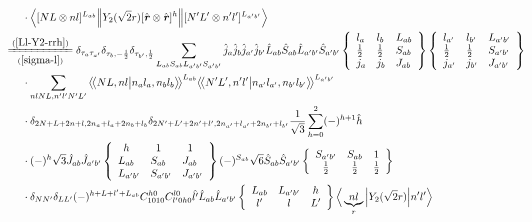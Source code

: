 \documentclass[master]{shnuthesis}
\newcommand{\llangle}{\big\langle\!\big\langle}
\newcommand{\rrangle}{\big\rangle\!\big\rangle}
\newcommand{\bmr}{\textbf{\textit{r}}}
\newcommand{\ap}{a^\prime}
\newcommand{\bp}{b^\prime}
\newcommand{\il}{\!\!\!\!\!\!\!\!\!\!}
\newcommand{\zdydh}{\xlongequal}
\begin{document}
\begin{align}
    & \cdot \Big\langle [N L \otimes n l]^{L_{ab}} \Big\| Y_2(\sqrt{2}r) [\hat{\bmr} \otimes \hat{\bmr}]^h \Big\| [N^\prime L^\prime \otimes n^\prime l^\prime]^{L_{\ap\bp}} \Big\rangle \\
    &\il \zdydh[(\ref{sigma-l})]{(\ref{Ll-Y2-rrh})} \delta_{\tau_a \tau_{\ap}}\delta_{\tau_b, -\frac{1}{2}}\delta_{\tau_{\bp}, \frac{1}{2}} \sum_{L_{ab}S_{ab}L_{\ap\bp}S_{\ap\bp}} \hat{j}_a\hat{j}_b\hat{j}_{\ap}\hat{j}_{\bp}\hat{L}_{ab}\hat{S}_{ab}\hat{L}_{\ap\bp}\hat{S}_{\ap\bp}  \left\{\begin{array}{lll}l_{a} & l_{b} & L_{ab} \\ \frac{1}{2} & \frac{1}{2} & S_{ab} \\j_{a} & j_{b} & J_{ab} \end{array}\right\} \left\{\begin{array}{lll}l_{\ap} & l_{\bp} & L_{\ap\bp} \\ \frac{1}{2} & \frac{1}{2} & S_{\ap\bp} \\j_{\ap} & j_{\bp} & J_{\ap\bp} \end{array}\right\}  \notag \\
    & \cdot \sum_{nlNL,n^\prime l^\prime N^\prime L^\prime} \llangle N L, n l \big| n_{a} l_{a}, n_{b} l_{b} \rrangle^{L_{ab}} \llangle N^\prime L^\prime, n^\prime l^\prime \big| n_{a^\prime} l_{a^\prime}, n_{b^\prime} l_{b^\prime} \rrangle^{L_{\ap\bp}} \notag\\
    & \cdot \delta_{2N+L+2n+l,2n_a+l_a+2n_b+l_b}\delta_{2N^\prime+L^\prime+2n^\prime+l^\prime,2n_{a^\prime}+l_{a^\prime}+2n_{b^\prime}+l_{b^\prime}} \frac{1}{\sqrt{3}} \sum_{h=0}^{2} (-)^{h+1}\hat{h}  \notag\\
    & \cdot (-)^{h}\sqrt{3}\hat{J}_{ab}\hat{J}_{\ap\bp}  \left\{\begin{array}{lll} \,\,\,h & \,\,\,1 & \,\,\,1 \\ L_{ab} & S_{ab} & J_{ab} \\ L_{\ap\bp} & S_{\ap\bp} & J_{\ap\bp} \end{array}\right\}  (-)^{S_{ab}}\sqrt{6}\hat{S}_{ab}\hat{S}_{\ap\bp}  \left\{\begin{array}{ccc} S_{\ap\bp} & S_{ab} & 1 \\ \frac{1}{2} & \frac{1}{2} & \frac{1}{2} \end{array}\right\}  \notag\\
    & \cdot \delta_{NN^\prime}\delta_{LL^\prime}(-)^{h+L+l^\prime+L_{ab}}C_{1010}^{h0}C_{l^\prime 0 h 0}^{l0} \hat{l^\prime}\hat{L}_{ab}\hat{L}_{\ap\bp}  \left\{\begin{array}{ccc} L_{ab} & L_{\ap\bp} & h \\ l^\prime & l & L^\prime \end{array}\right\}  \Big\langle \underbrace{n l}_{r} \Big| Y_2(\sqrt{2}r) \Big| n^\prime l^\prime \Big\rangle \\

\end{align}
\end{document}
